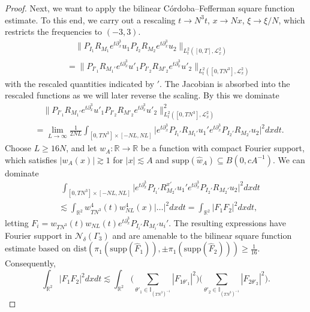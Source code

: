\documentclass{amsart}
\theoremstyle{definition}
\newcommand{\R}{\mathbb{R}}
\begin{document}
\begin{proof}
Next, we want to apply the bilinear C\'ordoba--Fefferman square function estimate. To this end, we carry out a rescaling $t \to N^3 t$, $x \to N x$, $\xi \to \xi / N$, which restricts the frequencies to $(-3,3)$.
\begin{equation*}
\begin{split}
&\quad \| P_{I_1} R_{M_1} e^{t \partial_x^3} u_1 P_{I_2} R_{M_2} e^{t \partial_x^3} u_2 \|_{L_t^2([0,T], \mathcal{L}^2_x)} \\
&= \| P_{I'_1} R_{M_1'} e^{t \partial_x^3} u'_1 P_{I'_2} R_{M'_2} e^{t \partial_x^3} u'_2 \|_{L_t^2([0,T N^3], \mathcal{L}^2_x)}
\end{split}	
\end{equation*}
with the rescaled quantities indicated by $'$. The Jacobian is absorbed into the rescaled functions as we will later reverse the scaling. By this we dominate
\begin{equation*}
\begin{split}
&\quad \| P_{I'_1} R_{M_1'} e^{t \partial_x^3} u'_1 P_{I'_2} R_{M'_2} e^{t \partial_x^3} u'_2 \|^2_{L_t^2([0,TN^3], \mathcal{L}^2_x)} \\
&= \lim_{L \to \infty} \frac{1}{2NL} \int_{[0,TN^3] \times [-NL,NL]} \big| e^{t \partial_x^3} P_{I_1'} R_{M_1'}  u_1' e^{t \partial_x^3} P_{I_2'} R_{M_2'} u_2 \big|^2 dx dt.
\end{split}
\end{equation*}
Choose $L \geq 16N$, and let $w_A: \R \to \R$ be a function with compact Fourier support, which satisfies
$|w_A(x)| \gtrsim 1$ for $|x| \lesssim A$ and $\text{supp}(\hat{w}_A) \subseteq B(0,c A^{-1})$. We can dominate
\begin{equation*}
\begin{split}
&\; \int_{[0,TN^3] \times [-NL,NL]} \big| e^{t \partial_x^3} P_{I_1'} R_{M_2'}^{x'}  u_1' e^{t \partial_x^3} P_{I_2'} R_{M_2'} u_2 \big|^2 dx dt \\ &\lesssim \int_{\R^2} w^4_{T N^3}(t) w_{NL}^4(x) \big| \ldots \big|^2 dx dt = \int_{\R^2} |F_1 F_2|^2 dx dt,
\end{split}
\end{equation*}
letting $F_i = w_{TN^3}(t) w_{NL}(t) e^{t \partial_x^3} P_{I_i'} R_{M_{i}'}  u_i'$. 
The resulting expressions have Fourier support in $\mathcal{N}_{\delta}(\Gamma_3)$ and are amenable to the bilinear square function estimate based on $\text{dist}(\pi_1(\text{supp}(\hat{F}_1)),\pm \pi_1(\text{supp}(\hat{F}_2))) \geq \frac{1}{16}$. Consequently,
\begin{equation*}
\int_{\R^2} \big| F_1 F_2 \big|^2 dx dt \lesssim \int_{\R^2} \big( \sum_{\theta'_1 \in \mathbb{I}_{(TN^3)^{-1}}} |F_{1 \theta'_1}|^2 \big) \big( \sum_{\theta'_2 \in \mathbb{I}_{(TN^3)^{-1}}} | F_{2 \theta'_2}  |^2 \big). 

\end{equation*}
\end{proof}
\end{document}

